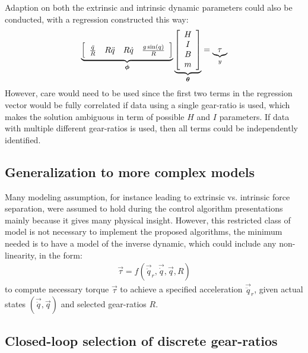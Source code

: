 Adaption on both the extrinsic and intrinsic dynamic parameters could also be conducted, with a regression constructed this way:
%
\begin{align}
	\underbrace{ \left[
	\begin{array}{c c c c}
		\frac{\ddot{q}}{R} &  R\ddot{q} & R \dot{q} & \frac{ g \sin( q ) }{R}
	\end{array} \right] }_{\vec{\phi}}
	\underbrace{ \left[
	\begin{array}{c}
		H \\ I \\ B \\ m
	\end{array} \right] }_{\vec{\theta}}
	 = \underbrace{ \tau }_{y}
\end{align}
%
However, care would need to be used since the first two terms in the regression vector would be fully correlated if data using a single gear-ratio is used, which makes the solution ambiguous in term of possible $H$ and $I$ parameters. If data with multiple different gear-ratios is used, then all terms could be independently identified. 


\subsection{Generalization to more complex models}

Many modeling assumption, for instance leading to extrinsic vs. intrinsic force separation, were assumed to hold during the control algorithm presentations mainly because it gives many physical insight. However, this restricted class of model is not necessary to implement the proposed algorithms, the minimum needed is to have a model of the inverse dynamic, which could include any non-linearity, in the form:
%
\begin{align}
	\vec{\tau}  = f( \vec{\ddot{q}}_r , \vec{\dot{q}} , \vec{q} , R )
\end{align}
%
to compute necessary torque $\vec{\tau}$ to achieve a specified acceleration $\vec{\ddot{q}}_r$, given actual states $(\vec{\dot{q}} , \vec{q})$ and selected gear-ratios $R$.


\subsection{Closed-loop selection of discrete gear-ratios}

